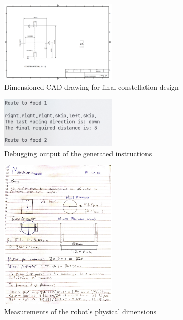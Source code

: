 \documentclass[conference]{IEEEtran}
\begin{document}
\begin{figure}[htbp]
	\centerline{\includegraphics[width=0.5\textwidth]{constellation-cad.png}}
	\caption{Dimensioned CAD drawing for final constellation design}
	\label{fig:constellation-cad}
\end{figure}

\begin{figure}[htbp]
	\centerline{\includegraphics[width=0.5\textwidth]{pathfinding-instructions.png}}
	\caption{Debugging output of the generated instructions}
	\label{fig:pathfinding-instructions}
\end{figure}

\begin{figure}[htbp]
	\centerline{\includegraphics[width=0.5\textwidth]{physical-measurements.png}}
	\caption{Measurements of the robot's physical dimensions}
	\label{fig:physical-dimensions}
\end{figure}
\end{document}
